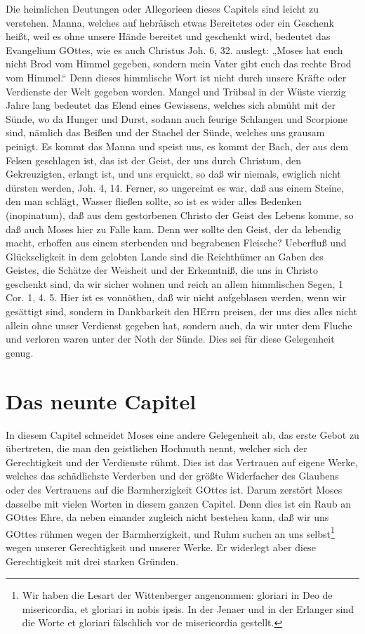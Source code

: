 Die heimlichen Deutungen oder Allegorieen dieses Capitels sind leicht zu verstehen. Manna, welches auf hebräisch etwas Bereitetes oder ein Geschenk heißt, weil es ohne unsere Hände bereitet und geschenkt wird, bedeutet das Evangelium GOttes, wie es auch Christus Joh. 6, 32. auslegt: „Moses hat euch nicht Brod vom Himmel gegeben, sondern mein Vater gibt euch das rechte Brod vom Himmel.“ Denn dieses himmlische Wort ist nicht durch unsere Kräfte oder Verdienste der Welt gegeben worden. Mangel und Trübsal in der Wüste vierzig Jahre lang bedeutet das Elend eines Gewissens, welches sich abmüht mit der Sünde, wo da Hunger und Durst, sodann auch feurige Schlangen und Scorpione sind, nämlich das Beißen und der Stachel der Sünde, welches uns grausam peinigt. Es kommt das Manna und speist uns, es kommt der Bach, der aus dem Felsen geschlagen ist, das ist der Geist, der uns durch Christum, den Gekreuzigten, erlangt ist, und uns erquickt, so daß wir niemals, ewiglich nicht dürsten werden, Joh. 4, 14. Ferner, so ungereimt es war, daß aus einem Steine, den man schlägt, Wasser fließen sollte, so ist es wider alles Bedenken (inopinatum), daß aus dem gestorbenen Christo der Geist des Lebens komme, so daß auch Moses
hier zu Falle kam. Denn wer sollte den Geist, der da lebendig macht, erhoffen aus einem sterbenden und begrabenen Fleische? Ueberfluß und Glückseligkeit in dem gelobten Lande sind die Reichthümer an Gaben des Geistes, die Schätze der Weisheit und der Erkenntniß, die uns in Christo geschenkt sind, da wir sicher wohnen und reich an allem himmlischen Segen, 1 Cor. 1, 4. 5. Hier ist es vonnöthen, daß wir nicht aufgeblasen werden, wenn wir gesättigt sind, sondern in Dankbarkeit den HErrn preisen, der uns dies alles nicht allein ohne unser Verdienst gegeben hat, sondern auch, da wir unter dem Fluche und verloren waren unter der Noth der Sünde. Dies sei für diese Gelegenheit genug.

\section{Das neunte Capitel}

In diesem Capitel schneidet Moses eine andere Gelegenheit ab, das erste Gebot zu übertreten, die man den geistlichen Hochmuth nennt, welcher sich der Gerechtigkeit und der Verdienste rühmt. Dies ist das Vertrauen auf eigene Werke, welches das schädlichste Verderben und der größte Widerfacher des Glaubens oder des Vertrauens auf die Barmherzigkeit GOttes ist. Darum zerstört Moses dasselbe mit vielen Worten in diesem ganzen Capitel. Denn dies ist ein Raub an GOttes Ehre, da neben einander zugleich nicht bestehen kann, daß wir uns GOttes rühmen wegen der Barmherzigkeit, und Ruhm suchen an uns selbst\footnote{Wir haben die Lesart der Wittenberger angenommen: gloriari in Deo de misericordia, et gloriari in nobis ipsis. In der Jenaer und in der Erlanger sind die Worte et gloriari fälschlich vor de misericordia gestellt.} wegen unserer Gerechtigkeit und unserer Werke. Er widerlegt aber diese Gerechtigkeit mit drei starken Gründen.

